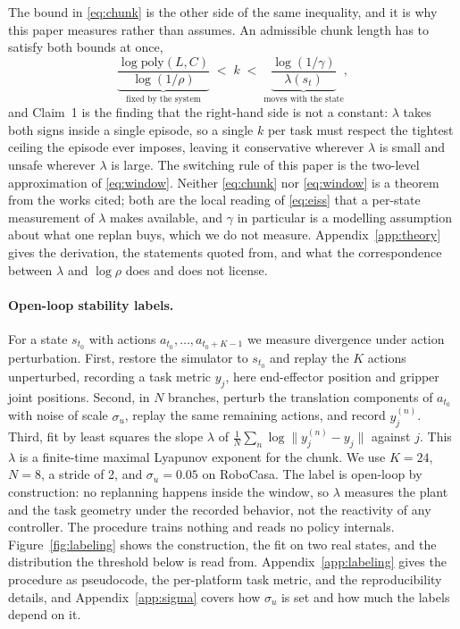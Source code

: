 The bound in \eqref{eq:chunk} is the other side of the same inequality, and it
is why this paper measures rather than assumes. An admissible chunk length has to
satisfy both bounds at once,
\begin{equation}
\underbrace{\frac{\log \mathrm{poly}(L,C)}{\log(1/\rho)}}_{\text{fixed by the system}}
\;<\; k \;<\;
\underbrace{\frac{\log(1/\gamma)}{\lambda(s_t)}}_{\text{moves with the state}} ,
\label{eq:window}
\end{equation}
and Claim~1 is the finding that the right-hand side is not a constant: $\lambda$
takes both signs inside a single episode, so a single $k$ per task must respect
the tightest ceiling the episode ever imposes, leaving it conservative wherever
$\lambda$ is small and unsafe wherever $\lambda$ is large. The switching rule of
this paper is the two-level approximation of \eqref{eq:window}. Neither
\eqref{eq:chunk} nor \eqref{eq:window} is a theorem from the works cited; both
are the local reading of \eqref{eq:eiss} that a per-state measurement of
$\lambda$ makes available, and $\gamma$ in particular is a
modelling assumption about what one replan buys, which we do not measure.
Appendix~\ref{app:theory} gives the derivation, the statements quoted from, and
what the correspondence between $\lambda$ and $\log\rho$ does and does not
license.

\paragraph{Open-loop stability labels.}
For a state $s_{t_0}$ with actions $a_{t_0}, \dots, a_{t_0+K-1}$ we measure
divergence under action perturbation. First, restore the simulator to
$s_{t_0}$ and replay the $K$ actions unperturbed, recording a task metric
$y_j$, here end-effector position and gripper joint positions. Second, in $N$
branches, perturb the translation components of $a_{t_0}$ with noise of scale
$\sigma_u$, replay the same remaining actions, and record $y^{(n)}_j$. Third,
fit by least squares the slope $\lambda$ of
$\frac{1}{N}\sum_n \log \lVert y^{(n)}_j - y_j \rVert$ against $j$. This
$\lambda$ is a finite-time maximal Lyapunov exponent for the chunk. We use
$K{=}24$, $N{=}8$, a stride of 2, and $\sigma_u{=}0.05$ on RoboCasa. The label
is open-loop by construction: no replanning happens inside the window, so
$\lambda$ measures the plant and the task geometry under the recorded
behavior, not the reactivity of any controller. The procedure trains nothing
and reads no policy internals.
Figure~\ref{fig:labeling} shows the construction, the fit on two real states,
and the distribution the threshold below is read from.
Appendix~\ref{app:labeling} gives the procedure as pseudocode, the per-platform
task metric, and the reproducibility details, and Appendix~\ref{app:sigma}
covers how $\sigma_u$ is set and how much the labels depend on it.

